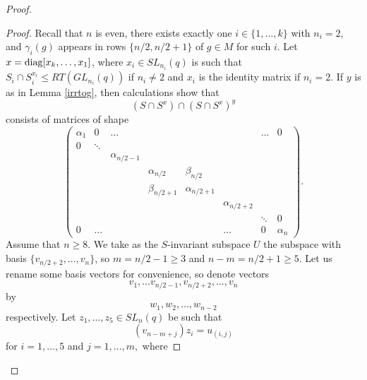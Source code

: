 \begin{proof}
\begin{proof}
 Recall that $n$ is even, there exists exactly one $i \in \{1, \ldots, k\}$ with $n_i=2$, and $\gamma_i(g)$ appears in rows  $\{n/2,n/2+1\}$ of $g \in M$ for such $i$.  Let $x= \mathrm{diag}[x_k, \ldots, x_1]$, where $x_i\in SL_{n_i}(q)$ is such that $S_i \cap S_i^{x_i} \le RT(GL_{n_i}(q))$ if $n_i \ne 2$ and $x_i$ is the identity matrix if $n_i=2.$ If $y$ is as in Lemma \ref{irrtog}, then   calculations show that  
$$(S \cap S^x) \cap (S \cap S^x)^y$$ consists of matrices of  shape 
\begin{equation}\label{sered} 
  \begin{pmatrix} 
\alpha_1 &0       & \dots          &              &               &              &\dots  &0  \\
0        & \ddots &                &              &               &              &       &  \\
         &        & \alpha_{n/2-1} &              &               &              &       &   \\
         &        &                &\alpha_{n/2}  &\beta_{n/2}    &              &       &   \\
         &        &                &\beta_{n/2+1} &\alpha_{n/2+1} &              &       &   \\
         &        &                &              &               &\alpha_{n/2+2}&       & \\
         &        &                &              &               &              &\ddots & 0 \\
 0       & \dots  &                &              &               &     \dots    &  0    & \alpha_n 
\end{pmatrix}.
\end{equation}
Assume that $n \ge 8$. We take as the $S$-invariant subspace $U$ the subspace with  basis $\{v_{n/2+2}, \ldots, v_n\}$, so
$m=n/2-1 \ge 3$ and $n-m=n/2+1\ge 5.$  Let us rename some basis vectors for convenience, so denote vectors 
$$v_1, \ldots v_{n/2-1}, v_{n/2+2}, \ldots, v_n$$ by $$w_1, w_2, \ldots, w_{n-2}$$ respectively.
Let  $z_1, \ldots, z_5 \in SL_n(q)$ be such that $$(v_{n-m+j})z_i=u_{(i,j)}$$ for $i=1, \ldots, 5$ and $j=1, \ldots, m,$ where


\end{proof}
\end{proof}
